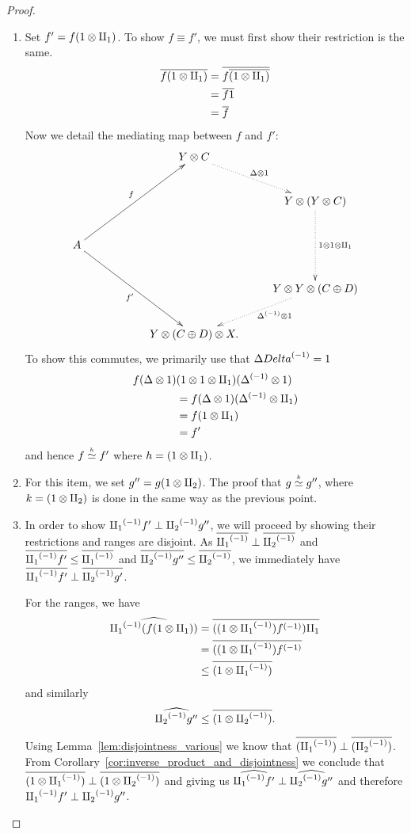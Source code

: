 \begin{proof}
  \prepprooflist
  \begin{enumerate}[{(}i{)}]
  \item Set $f' = f(1\otimes\amalg_{1})$.
    To show $f\equiv f'$, we must first show their restriction is the same.
    \begin{align*}
      \overline{f(1\otimes\amalg_{1})} &= \overline{f\overline{(1\otimes\amalg_{1})}}\\
      & = \overline{f 1}\\
      &=  \overline{f}
    \end{align*}
    Now we detail the mediating map between $f$ and $f'$:
    \[
    \xymatrix @C=25pt @R=25pt{
      & & Y \* C \ar@{.>}[dr]^{\Delta\* 1}\\
      & & & Y \* (Y\* C) \ar@{.>}[dd]^{1\*1\*\cpa}\\
      A \ar[uurr]^f \ar[ddrr]_{f'} \\
      & & & Y \* Y\*(C\+ D) \ar@{.>}[dl]^(.4){\inv{\Delta}\* 1}\\
      && Y\*(C\+ D)\*X.
    }
    \]
  To show this commutes, we primarily use that $\Delta{Delta}^{(-1)} = 1$
  \begin{align*}
    f(\Delta\otimes1)&(1\otimes1\otimes\amalg_{1})({\Delta}^{(-1)}\otimes1) \\
    &= f(\Delta\otimes1)({\Delta}^{(-1)} \otimes \amalg_{1})\\
    &= f(1 \otimes \amalg_{1})\\
    &= f'
  \end{align*}
  and hence $f\overset{\scriptscriptstyle h}{\simeq}f'$ where $h = (1\otimes\amalg_{1})$.
  \item For this item, we set $g'' = g(1\otimes\amalg_{2})$. The proof that $g\overset{\scriptscriptstyle k}{\simeq}g''$, where
    $k = (1\otimes\amalg_{2})$ is done in the same way as the previous point.
  \item In order to show  ${\amalg_{1}}^{(-1)} f' \perp {\amalg_{2}}^{(-1)} g''$, we will proceed by showing their restrictions
    and ranges are disjoint.
    As $\overline{{\amalg_{1}}^{(-1)}} \perp \overline{{\amalg_{2}}^{(-1)}}$ and $\overline{{\amalg_{1}}^{(-1)}f'} \le \overline{{\amalg_{1}}^{(-1)}}$ and
    $\overline{{\amalg_{2}}^{(-1)}g''} \le \overline{{\amalg_{2}}^{(-1)}}$, we immediately have
    $\overline{{\amalg_{1}}^{(-1)}f'} \perp \overline{{\amalg_{2}}^{(-1)}g'}$.

    For the ranges, we have
    \begin{align*}
      \widehat{{\amalg_{1}}^{(-1)} (f (1\otimes\amalg_{1}))} &=
      \overline{((1\otimes{\amalg_{1}}^{(-1)}){f}^{(-1)})\amalg_{1}}\\
      &= \overline{((1\otimes{\amalg_{1}}^{(-1)}){f}^{(-1)}}\\
      &\le \overline{(1\otimes{\amalg_{1}}^{(-1)})}
    \end{align*}
    and similarly
    \[
      \widehat{{\amalg_{2}}^{(-1)} g''} \le \overline{(1\otimes{\amalg_{2}}^{(-1)})}.
    \]

    Using Lemma~\ref{lem:disjointness_various}
    we know that $\overline{({\amalg_{1}}^{(-1)})}\perp \overline{({\amalg_{2}}^{(-1)})}$. From
    Corollary~\ref{cor:inverse_product_and_disjointness}
    we conclude that $\overline{(1\otimes{\amalg_{1}}^{(-1)})}\perp \overline{(1\otimes{\amalg_{2}}^{(-1)})}$ and giving us
    $\widehat{{\amalg_{1}}^{(-1)}f'} \perp \widehat{{\amalg_{2}}^{(-1)}g''}$ and therefore ${\amalg_{1}}^{(-1)}f' \perp {\amalg_{2}}^{(-1)}g''$.
  \end{enumerate}
\end{proof}
